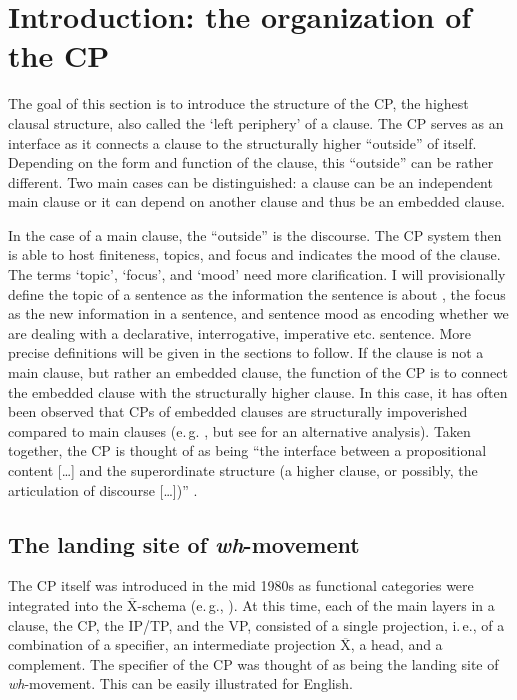 \section{Introduction: the organization of the CP}\label{introcpchapter}
The goal of this section is to introduce the structure of the CP, the highest clausal structure, also called the `left periphery' of a clause. The CP serves as an interface as it connects a clause to the structurally higher ``outside'' of itself. Depending on the form and function of the clause, this ``outside'' can be rather different. Two main cases can be distinguished: a clause can be an independent main clause or it can depend on another clause and thus be an embedded clause. 

In the case of a main clause, the ``outside'' is the discourse. The CP system then is able to host finiteness, topics, and focus and indicates the mood of the clause. The terms `topic', `focus', and `mood' need more clarification. I will provisionally define the topic of a sentence as the information the sentence is about \citep{reinhart1981pragmatics}, the focus as the new information in a sentence, and sentence mood as encoding whether we are dealing with a declarative, interrogative, imperative etc. sentence. More precise definitions will be given in the sections to follow. If the clause is not a main clause, but rather an embedded clause, the function of the CP is to connect the embedded clause with the structurally higher clause. In this case, it has often been observed that CPs of embedded clauses are structurally impoverished compared to main clauses (e.\,g. \citealt{haegeman2003conditional}, but see \citealt{haegeman2013syntax} for an alternative analysis). Taken together, the CP is thought of as being ``the interface between a propositional content [\dots ] and the superordinate structure (a higher clause, or possibly, the articulation of discourse [\dots ])'' \citep[283]{rizzi1997fine}.

\subsection{The landing site of \textit{wh}-movement}

The CP itself was introduced in the mid 1980s as functional categories were integrated into the $\overline{\textrm{X}}$-schema (e.\,g., \citealt{chomsky1986barr, speas1986ecifiers}). At this time, each of the main layers in a clause, the CP, the IP/TP, and the VP, consisted of a single projection, i.\,e., of a combination of a specifier, an intermediate projection $\overline{\textrm{X}}$, a head, and a complement. The specifier of the CP was thought of as being the landing site of \textit{wh}-movement. This can be easily illustrated for English. 

